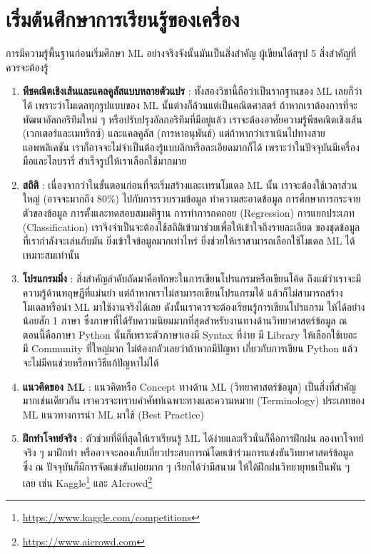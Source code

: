 \section{เริ่มต้นศึกษาการเรียนรู้ของเครื่อง}

การมีความรู้พื้นฐานก่อนเริ่มศึกษา ML อย่างจริงจังนั้นมันเป็นสิ่งสำคัญ ผู้เขียนได้สรุป 5 สิ่งสำคัญที่ควรจะต้องรู้ 

\begin{enumerate}
    \item \textbf{พีชคณิตเชิงเส้นและแคลคูลัสแบบหลายตัวแปร} : ทั้งสองวิชานี้ถือว่าเป็นรากฐานของ ML เลยก็ว่าได้ 
    เพราะว่าโมเดลทุกรูปแบบของ ML นั้นต่างก็ล้วนแต่เป็นคณิตศาสตร์ ถ้าหากเราต้องการที่จะพัฒนาอัลกอริทึมใหม่ ๆ 
    หรือปรับปรุงอัลกอริทึมที่มีอยู่แล้ว เราจะต้องอาศัยความรู้พีชคณิตเชิงเส้น (เวกเตอร์และเมทริกซ์) และแคลคูลัส (การหาอนุพันธ์) 
    แต่ถ้าหากว่าเราเน้นไปทางสายแอพพลิเคชัน เราก็อาจจะไม่จำเป็นต้องรู้แบบลึกหรือละเอียดมากก็ได้ เพราะว่าในปัจจุบันมีเครื่องมือและไลบรารี่%
    สำเร็จรูปให้เราเลือกใช้มากมาย
    \item \textbf{สถิติ} : เนื่องจากว่าในขั้นตอนก่อนที่จะเริ่มสร้างและเทรนโมเดล ML นั้น เราจะต้องใช้เวลาส่วนใหญ่ 
    (อาจจะมากถึง 80\%) ไปกับการรวบรวมข้อมูล ทำความสะอาดข้อมูล การศึกษาการกระจายตัวของข้อมูล การตั้งและทดสอบสมมติฐาน 
    การทำการถดถอย (Regression) การแยกประเภท (Classification) เราจึงจำเป็นจะต้องใช้สถิติเข้ามาช่วยเพื่อให้เข้าใจถึงรายละเอียด
    ของชุดข้อมูลที่เรากำลังจะเล่นกับมัน ยิ่งเข้าใจข้อมูลมากเท่าไหร่ ยิ่งช่วยให้เราสามารถเลือกใช้โมเดล ML ได้เหมาะสมเท่านั้น 
    \item \textbf{โปรแกรมมิ่ง} : สิ่งสำคัญลำดับถัดมาคือทักษะในการเขียนโปรแกรมหรือเขียนโค้ด ถึงแม้ว่าเราจะมีความรู้ด้านทฤษฎีที่แม่นยำ 
    แต่ถ้าหากเราไม่สามารถเขียนโปรแกรมได้ แล้วก็ไม่สามารถสร้างโมเดลหรือนำ ML มาใช้งานจริงได้เลย ดังนั้นเราควรจะต้องเรียนรู้การเขียนโปรแกรม
    ให้ได้อย่างน้อยสัก 1 ภาษา ซึ่งภาษาที่ได้รับความนิยมมากที่สุดสำหรับงานทางด้านวิทยาศาสตร์ข้อมูล ณ ตอนนี้คือภาษา Python 
    นั่นก็เพราะตัวภาษาเองมี Syntax ที่ง่าย มี Library ให้เลือกใช้เยอะ มี Community ที่ใหญ่มาก ไม่ต้องกลัวเลยว่าถ้าหากมีปัญหา%
    เกี่ยวกับการเขียน Python แล้วจะไม่มีคนช่วยหรือหาวิธีแก้ปัญหาไม่ได้
    \item \textbf{แนวคิดของ ML} : แนวคิดหรือ Concept ทางด้าน ML (วิทยาศาสตร์ข้อมูล) เป็นสิ่งที่สำคัญมากเช่นเดียวกัน
    เราควรจะทราบคำศัพท์เฉพาะทางและความหมาย (Terminology) ประเภทของ ML แนวทางการนำ ML มาใช้ (Best Practice)
    \item \textbf{ฝึกทำโจทย์จริง} : ตัวช่วยที่ดีที่สุดให้เราเรียนรู้ ML ได้ง่ายและเร็วนั่นก็คือการฝึกฝน ลองหาโจทย์จริง ๆ มาฝึกทำ
    หรืออาจจะลองเก็บเกี่ยวประสบการณ์โดยเข้าร่วมการแข่งขันวิทยาศาสตร์ข้อมูล ซึ่ง ณ ปัจจุบันก็มีการจัดแข่งขันบ่อยมาก ๆ เรียกได้ว่ามีสนาม
    ให้ได้ฝึกฝนวิทยายุทธเป็นพัน ๆ เลย เช่น Kaggle\footnote{\url{https://www.kaggle.com/competitions}} และ
    AIcrowd\footnote{\url{https://www.aicrowd.com}} 
\end{enumerate}

